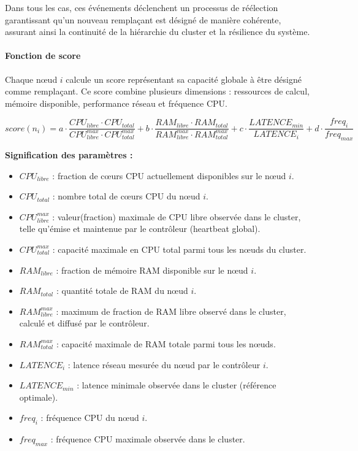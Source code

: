 \documentclass[12pt,a4paper]{report}
\theoremstyle{definition}
\begin{document}
Dans tous les cas, ces événements déclenchent un processus de réélection garantissant qu’un nouveau remplaçant est désigné de manière cohérente, assurant ainsi la continuité de la hiérarchie du cluster et la résilience du système.

\paragraph{Fonction de score}

Chaque nœud $i$ calcule un score représentant sa capacité globale à être désigné comme remplaçant. Ce score combine plusieurs dimensions : ressources de calcul, mémoire disponible, performance réseau et fréquence CPU.

\[
score(n_i) =
a \cdot \frac{CPU_{libre} \cdot CPU_{total}}{CPU_{libre}^{max} \cdot CPU_{total}^{max}}
+ b \cdot \frac{RAM_{libre} \cdot RAM_{total}}{RAM_{libre}^{max} \cdot RAM_{total}^{max}}
+ c \cdot \frac{LATENCE_{min}}{LATENCE_i}
+ d \cdot \frac{freq_i}{freq_{max}}
\]

\textbf{Signification des paramètres :}

\begin{itemize}
    \item \textbf{$CPU_{libre}$} : fraction de cœurs CPU actuellement disponibles sur le nœud $i$.
    \item \textbf{$CPU_{total}$} : nombre total de cœurs CPU du nœud $i$.
    \item \textbf{$CPU_{libre}^{max}$} : valeur(fraction) maximale de CPU libre observée dans le cluster, telle qu’émise et maintenue par le contrôleur (heartbeat global).
    \item \textbf{$CPU_{total}^{max}$} : capacité maximale en CPU total parmi tous les nœuds du cluster.

    \item \textbf{$RAM_{libre}$} : fraction de mémoire RAM disponible sur le nœud $i$.
    \item \textbf{$RAM_{total}$} : quantité totale de RAM du nœud $i$.
    \item \textbf{$RAM_{libre}^{max}$} : maximum de fraction de RAM libre observé dans le cluster, calculé et diffusé par le contrôleur.
    \item \textbf{$RAM_{total}^{max}$} : capacité maximale de RAM totale parmi tous les nœuds.

    \item \textbf{$LATENCE_i$} : latence réseau mesurée du nœud par le contrôleur $i$.
    \item \textbf{$LATENCE_{min}$} : latence minimale observée dans le cluster (référence optimale).

    \item \textbf{$freq_i$} : fréquence CPU du nœud $i$.
    \item \textbf{$freq_{max}$} : fréquence CPU maximale observée dans le cluster.
\end{itemize}
\end{document}
